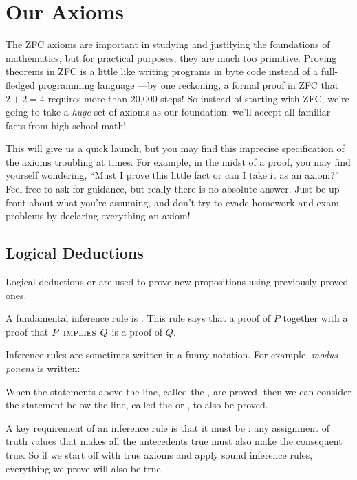 \section{Our Axioms}

The ZFC axioms are important in studying and justifying the foundations of
mathematics, but for practical purposes, they are much too primitive.
Proving theorems in ZFC is a little like writing programs in byte code
instead of a full-fledged programming language ---by one reckoning, a
formal proof in ZFC that $2 + 2 = 4$ requires more than 20,000 steps!  So
instead of starting with ZFC, we're going to take a \textit{huge} set of
axioms as our foundation: we'll accept all familiar facts from high school
math!

This will give us a quick launch, but you may find this imprecise
specification of the axioms troubling at times.  For example, in the midst
of a proof, you may find yourself wondering, ``Must I prove this little
fact or can I take it as an axiom?''  Feel free to ask for guidance, but
really there is no absolute answer.  Just be up front about what you're
assuming, and don't try to evade homework and exam problems by declaring
everything an axiom!

\subsection{Logical Deductions }

Logical deductions or  are used to prove new
propositions using previously proved ones.

A fundamental inference rule is .  This rule says that
a proof of $P$ together with a proof that $P \mathbin{\mathrm{\textsc{\,implies\,}}} Q$ is a proof of
$Q$.

Inference rules are sometimes written in a funny notation.  For example,
\emph{modus ponens} is written:
\begin{rul*}
\end{rul*}

When the statements above the line, called the , are
proved, then we can consider the statement below the line, called the
 or , to also be proved.

A key requirement of an inference rule is that it must be : any
assignment of truth values that makes all the antecedents true must also
make the consequent true.  So if we start off with true axioms and apply
sound inference rules, everything we prove will also be true.

